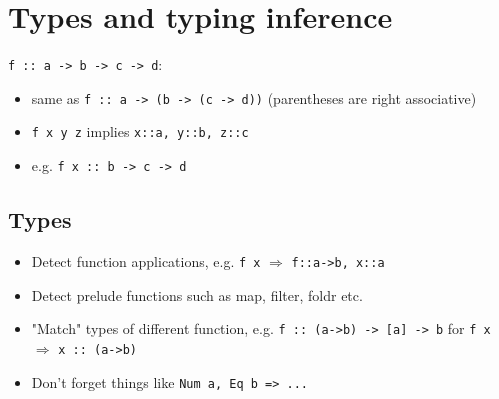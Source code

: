 \documentclass{article}
\begin{document}
\section{Types and typing inference}
\texttt{f :: a -> b -> c -> d}:
\begin{itemize}
    \item same as \texttt{f :: a -> (b -> (c -> d))} (parentheses are right associative)
    \item \texttt{f x y z} implies \texttt{x::a, y::b, z::c}
    \item e.g. \texttt{f x :: b -> c -> d}
\end{itemize}
\subsection{Types}
\begin{itemize}
    \item Detect function applications, e.g. \texttt{f x} $\Rightarrow$ \texttt{f::a->b, x::a}
    \item Detect prelude functions such as map, filter, foldr etc.
    \item "Match" types of different function, e.g. \texttt{f :: (a->b) -> [a] -> b} for  \texttt{f x} $\Rightarrow$ \texttt{x :: (a->b)}
    \item Don't forget things like \texttt{Num a, Eq b => ...}
\end{itemize}
\end{document}
